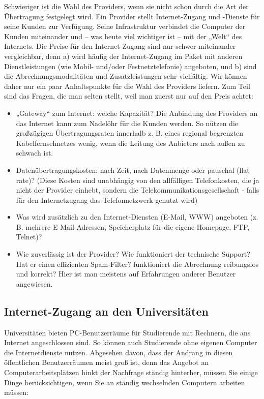 \documentclass[]{book}
\providecommand{\tightlist}{%
  \setlength{\itemsep}{0pt}\setlength{\parskip}{0pt}}
\theoremstyle{definition}
\theoremstyle{definition}
\theoremstyle{definition}
\theoremstyle{remark}
\begin{document}
Schwieriger ist die Wahl des Providers, wenn sie nicht schon durch die
Art der Übertragung festgelegt wird. Ein Provider stellt Internet-Zugang
und -Dienste für seine Kunden zur Verfügung. Seine Infrastruktur
verbindet die Computer der Kunden miteinander und -- was heute viel
wichtiger ist -- mit der „Welt`` des Internets. Die Preise für den
Internet-Zugang sind nur schwer miteinander vergleichbar, denn a) wird
häufig der Internet-Zugang im Paket mit anderen Dienstleistungen (wie
Mobil- und/oder Festnetztelefonie) angeboten, und b) sind die
Abrechnungsmodalitäten und Zusatzleistungen sehr vielfältig. Wir können
daher nur ein paar Anhaltspunkte für die Wahl des Providers liefern. Zum
Teil sind das Fragen, die man selten stellt, weil man zuerst nur auf den
Preis achtet:

\begin{itemize}
\tightlist
\item
  „Gateway`` zum Internet: welche Kapazität? Die Anbindung des Providers
  an das Internet kann zum Nadelöhr für die Kunden werden. So nützen die
  großzügigen Übertragungsraten innerhalb z. B. eines regional
  begrenzten Kabelfernsehnetzes wenig, wenn die Leitung des Anbieters
  nach außen zu schwach ist.
\item
  Datenübertragungskosten: nach Zeit, nach Datenmenge oder pauschal
  (flat rate)? (Diese Kosten sind unabhängig von den allfälligen
  Telefonkosten, die ja nicht der Provider einhebt, sondern die
  Telekommunikationsgesellschaft - falls für den Internetzugang das
  Telefonnetzwerk genutzt wird)
\item
  Was wird zusätzlich zu den Internet-Diensten (E-Mail, WWW) angeboten
  (z. B. mehrere E-Mail-Adressen, Speicherplatz für die eigene Homepage,
  FTP, Telnet)?
\item
  Wie zuverlässig ist der Provider? Wie funktioniert der technische
  Support? Hat er einen effizienten Spam-Filter? funktioniert die
  Abrechnung reibungslos und korrekt? Hier ist man meistens auf
  Erfahrungen anderer Benutzer angewiesen.
\end{itemize}

\subsection{Internet-Zugang an den
Universitäten}\label{internet-zugang-an-den-universitaten}

Universitäten bieten PC-Benutzerräume für Studierende mit Rechnern, die
ans Internet angeschlossen sind. So können auch Studierende ohne eigenen
Computer die Internetdienste nutzen. Abgesehen davon, dass der Andrang
in diesen öffentlichen Benutzerräumen meist groß ist, denn das Angebot
an Computerarbeitsplätzen hinkt der Nachfrage ständig hinterher, müssen
Sie einige Dinge berücksichtigen, wenn Sie an ständig wechselnden
Computern arbeiten müssen:
\end{document}
